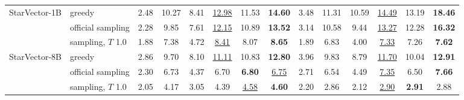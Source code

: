 \begin{table}[t]
\begin{tabular*}{\textwidth}{@{\extracolsep{\fill}}ll*{12}{c}@{}}
StarVector-1B & greedy & 2.48 & 10.27 & 8.41 & \underline{12.98} & 11.53 & \textbf{14.60} & 3.48 & 11.31 & 10.59 & \underline{14.49} & 13.19 & \textbf{18.46} \\
 & official sampling & 2.28 & 9.85 & 7.61 & \underline{12.15} & 10.89 & \textbf{13.52} & 3.14 & 10.58 & 9.44 & \underline{13.27} & 12.28 & \textbf{16.32} \\
 & sampling, $T$ 1.0 & 1.88 & 7.38 & 4.72 & \underline{8.41} & 8.07 & \textbf{8.65} & 1.89 & 6.83 & 4.00 & \underline{7.33} & 7.26 & \textbf{7.62} \\
\addlinespace[2pt]
StarVector-8B & greedy & 2.86 & 9.70 & 8.10 & \underline{11.11} & 10.83 & \textbf{12.80} & 3.96 & 9.83 & 8.79 & \underline{11.70} & 10.04 & \textbf{12.91} \\
 & official sampling & 2.30 & 6.73 & 4.37 & 6.70 & \textbf{6.80} & \underline{6.75} & 2.71 & 6.54 & 4.49 & \underline{7.35} & 6.50 & \textbf{7.66} \\
 & sampling, $T$ 1.0 & 2.05 & 4.17 & 3.05 & 4.39 & \underline{4.58} & \textbf{4.60} & 2.20 & 2.86 & 2.12 & \underline{2.90} & \textbf{2.91} & 2.88 \\
\bottomrule
\end{tabular*}
\end{table}
